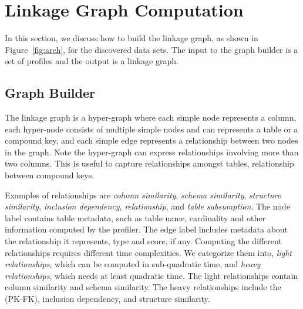 \section{Linkage Graph Computation}
\label{sec:stitching}
In this section, we discuss how to build the linkage graph, as shown in
Figure~\ref{fig:arch}, for the discovered data sets. The input to the graph
builder is a set of profiles and the output is a linkage graph.

\subsection{Graph Builder}
\label{subsec:graphbuild}

The linkage graph is a hyper-graph where each simple node represents a column, each hyper-node consists of multiple simple nodes and can represents a table or a compound key, and each simple edge represents a relationship between two nodes in the graph. Note the hyper-graph can express relationships involving more than two columns. This is useful to capture relationships amongst tables, \eg \pkfk relationship between compound keys.

Examples of relationships are 
\emph{column similarity}, 
\emph{schema similarity}, 
\emph{structure similarity}, %
\emph{inclusion dependency}, 
\emph{\pkfk relationship}, and
\emph{table subsumption}. 
The node label contains table metadata, such as table name, cardinality and
other information computed by the profiler. The edge label includes metadata
about the relationship it represents, \eg type and score, if any. Computing
the different relationships requires different time complexities. We 
categorize them into, \textit{light relationships}, which can be computed in
sub-quadratic time, and \textit{heavy relationships}, which needs at least
quadratic time. The light relationships contain column similarity and schema
similarity. The heavy relationships include the \pkfk (PK-FK), inclusion dependency, and structure similarity. 

